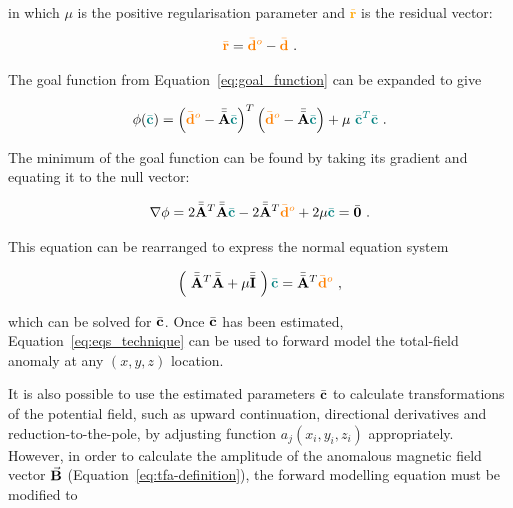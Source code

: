 \noindent
in which $\mu$ is the positive regularisation parameter and  \textcolor{orange}{$\bar{\mathbf{r}}$} is the residual vector:

\begin{equation}
    \label{eqs:resdiual}
    \textcolor{orange}{\bar{\mathbf{r}}} = \textcolor{orange}{\bar{\mathbf{d}}^o} - \textcolor{orange}{\bar{\mathbf{d}}}
    \ .
\end{equation}

\noindent
The goal function from Equation~\ref{eq:goal_function} can  be expanded to give

\begin{equation}
    \phi (\textcolor{teal}{\bar{\mathbf{c}}}) = 
    \left(\textcolor{orange}{\bar{\mathbf{d}}^o} - \bar{\bar{\mathbf{A}}} \textcolor{teal}{\bar{\mathbf{c}}}\right)^T 
    \left(\textcolor{orange}{\bar{\mathbf{d}}^o} - \bar{\bar{\mathbf{A}}} \textcolor{teal}{\bar{\mathbf{c}}}\right) 
    + \mu\ \textcolor{teal}{\bar{\mathbf{c}}^T\bar{\mathbf{c}}}
    \ .
\end{equation}

\noindent
The minimum of the goal function can be found by taking its gradient and equating it to the null vector:

\begin{equation}
    \nabla \phi = 
    2 \bar{\bar{\mathbf{A}}}^T \bar{\bar{\mathbf{A}}} \textcolor{teal}{\bar{\mathbf{c}}} 
    - 2\bar{\bar{\mathbf{A}}}^T \textcolor{orange}{\bar{\mathbf{d}}^o} 
    + 2 \mu \textcolor{teal}{\bar{\mathbf{c}}}
    = \bar{\mathbf{0}}
    \ .
\end{equation}

\noindent
This equation can be rearranged to express the normal equation system

\begin{equation}
    \left(\ \mat{A}^T \mat{A} + \mu \mat{I}\ \right) 
    \textcolor{teal}{\bvec{c}} =
    \mat{A}^T\textcolor{orange}{\bvec{d}^o}
    \ ,
    \label{eq:normal_equations}
\end{equation}

\noindent
which can be solved for \textcolor{teal}{$\bar{\mathbf{c}}$}. Once \textcolor{teal}{$\bar{\mathbf{c}}$} has been estimated, Equation~\ref{eq:eqs_technique} can be used to forward model the total-field anomaly at any $(x, y, z)$ location.

It is also possible to use the estimated parameters \textcolor{teal}{$\bar{\mathbf{c}}$} to calculate transformations of the potential field, such as upward continuation, directional derivatives and reduction-to-the-pole, by adjusting function $a_j(x_i, y_i, z_i)$ appropriately.
However, in order to calculate the amplitude of the anomalous magnetic field vector $\vec{\mathbf{B}}$ (Equation~\ref{eq:tfa-definition}), the forward modelling equation must be modified to


